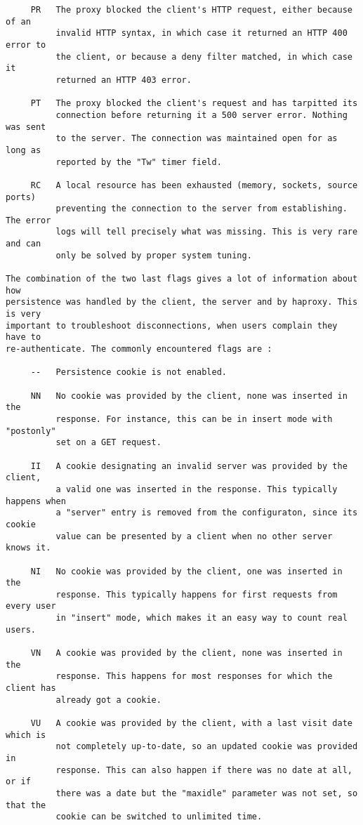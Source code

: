 \begin{verbatim}
     PR   The proxy blocked the client's HTTP request, either because of an
          invalid HTTP syntax, in which case it returned an HTTP 400 error to
          the client, or because a deny filter matched, in which case it
          returned an HTTP 403 error.

     PT   The proxy blocked the client's request and has tarpitted its
          connection before returning it a 500 server error. Nothing was sent
          to the server. The connection was maintained open for as long as
          reported by the "Tw" timer field.

     RC   A local resource has been exhausted (memory, sockets, source ports)
          preventing the connection to the server from establishing. The error
          logs will tell precisely what was missing. This is very rare and can
          only be solved by proper system tuning.

The combination of the two last flags gives a lot of information about how
persistence was handled by the client, the server and by haproxy. This is very
important to troubleshoot disconnections, when users complain they have to
re-authenticate. The commonly encountered flags are :

     --   Persistence cookie is not enabled.

     NN   No cookie was provided by the client, none was inserted in the
          response. For instance, this can be in insert mode with "postonly"
          set on a GET request.

     II   A cookie designating an invalid server was provided by the client,
          a valid one was inserted in the response. This typically happens when
          a "server" entry is removed from the configuraton, since its cookie
          value can be presented by a client when no other server knows it.

     NI   No cookie was provided by the client, one was inserted in the
          response. This typically happens for first requests from every user
          in "insert" mode, which makes it an easy way to count real users.

     VN   A cookie was provided by the client, none was inserted in the
          response. This happens for most responses for which the client has
          already got a cookie.

     VU   A cookie was provided by the client, with a last visit date which is
          not completely up-to-date, so an updated cookie was provided in
          response. This can also happen if there was no date at all, or if
          there was a date but the "maxidle" parameter was not set, so that the
          cookie can be switched to unlimited time.


\end{verbatim}
